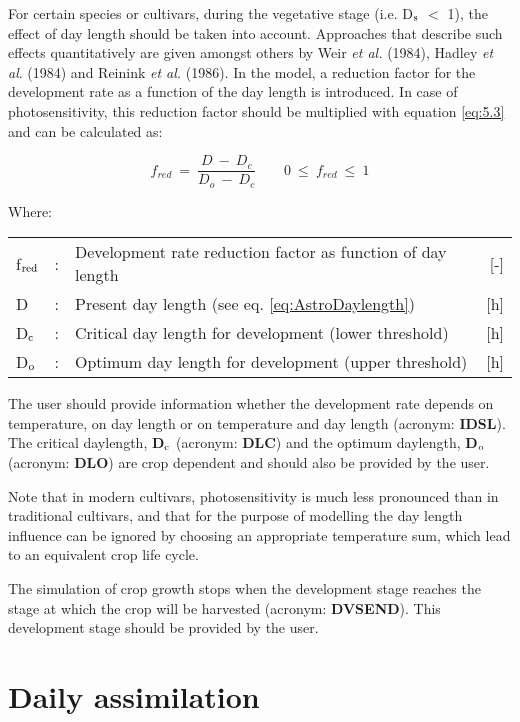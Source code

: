 For certain species or cultivars, during the vegetative stage (i.e. D$_{{\rm s}}$ $<$ 1), the 
effect of day length should be taken into account. Approaches that describe such effects 
quantitatively are given amongst others by  Weir {\it et al.} (1984), Hadley {\it et al}. (1984) 
and Reinink {\it et al.} (1986). In the model, a reduction factor for the development rate as a 
function of the day length is introduced. In case of photosensitivity, this reduction factor 
should be multiplied with equation \ref{eq:5.3} and can be calculated as:

\begin{equation}
\label{eq:5.5}
f_{red} ~=~{\frac{D ~-~D _{c} }{D _{o} ~-~ D _{c} }} ~~~~~~~~~0~\le ~f _{red} ~\le ~1
\end{equation}

Where:\\[5pt]
\begin{tabularx}{\textwidth}{llXr}
f$_{{\rm red}}$ &:& Development rate reduction factor as function of day length   &     [-]\\
D &:& Present day length (see eq. \ref{eq:AstroDaylength})   &     [h]\\
D$_{{\rm c}}$ &:& Critical day length for development (lower threshold)    &    [h]\\
D$_{{\rm o}}$ &:& Optimum day length for development (upper threshold)    &    [h]\\
\end{tabularx}

The user should provide information whether the development rate depends on temperature, 
on day length or on temperature and day length (acronym: {\bf IDSL}). The critical
daylength, {\bf D$_{{\rm c}}$} (acronym: {\bf DLC}) and the optimum daylength, 
{\bf D$_{{\rm o}}$} (acronym: {\bf DLO}) are crop dependent and should also be provided by 
the user. 

Note that in modern cultivars, photosensitivity is much less pronounced than in traditional
cultivars, and that for the purpose of modelling the day length influence can be ignored
by choosing an appropriate temperature sum, which lead to  an equivalent crop life cycle.

The simulation of crop growth stops when the development stage reaches the stage at
which the crop will be harvested (acronym: {\bf DVSEND}). This development stage should be
provided by the user. 

\section{Daily assimilation  } 

